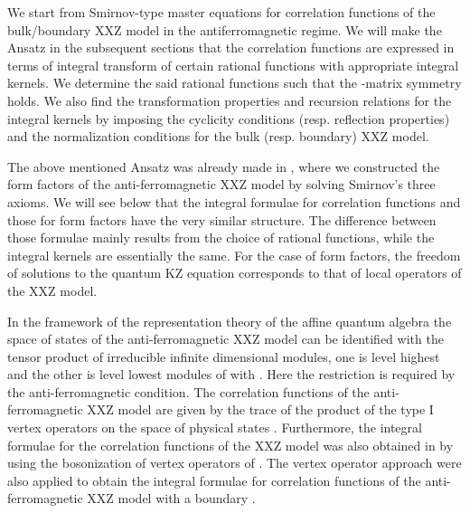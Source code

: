 \documentclass[a4paper,10pt]{article}
\begin{document}
We start from Smirnov-type master equations for 
correlation functions of the bulk/boundary XXZ model in 
the antiferromagnetic regime. We will make the Ansatz in 
the subsequent sections that the correlation functions 
are expressed in terms of integral transform of certain 
rational functions with appropriate integral kernels. 
We determine the said rational functions such that 
the \coordHE{}-matrix symmetry holds. We also find the 
transformation properties and recursion relations for 
the integral kernels by imposing the cyclicity conditions 
(resp. reflection properties) and the normalization 
conditions for the bulk (resp. boundary) XXZ model. 

The above mentioned Ansatz was already made in 
\cite{JKMQ,KMQ,affine}, where we constructed the 
form factors of the anti-ferromagnetic XXZ model 
by solving Smirnov's three axioms. We will see below 
that the integral formulae for correlation functions 
and those for form factors have the very similar structure. 
The difference between those formulae mainly results 
from the choice of rational functions, while the integral 
kernels are essentially the same. For the case of form 
factors, the freedom of solutions to the quantum KZ equation 
corresponds to that of local operators of the XXZ model. 

In the framework of the representation theory of 
the affine quantum algebra \cite{JMbk} 
the space of states of the anti-ferromagnetic XXZ model can 
be identified with the tensor product of irreducible infinite 
dimensional modules, one is level \coordHE{} highest and the other 
is level \coordHE{} lowest modules of 
\coordHE{} with 
\coordHE{}. Here the restriction \coordHE{} is required by the 
anti-ferromagnetic condition. The correlation functions of 
the anti-ferromagnetic XXZ model are given by the trace of 
the product of the type I vertex operators on the space of 
physical states \cite{JMbk}. Furthermore, 
the integral formulae for the 
correlation functions of the XXZ model was also obtained 
in \cite{CORR} by using the bosonization of vertex operators 
of \coordHE{}. 
The vertex operator approach were also applied to obtain
the integral formulae for correlation functions of the 
anti-ferromagnetic XXZ model with a boundary \cite{JKKKM}. 
\end{document}
